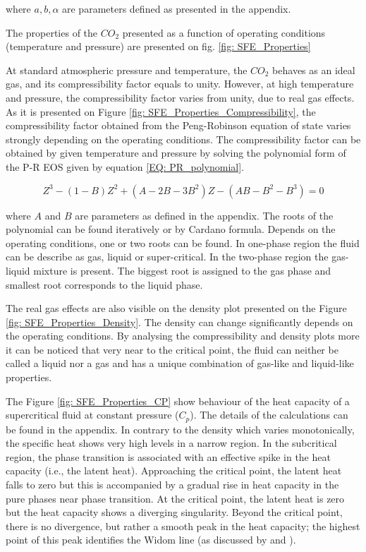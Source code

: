 \documentclass[../Article_Model_Parameters.tex]{subfiles}
\begin{document}
    where $a, b, \alpha$ are parameters defined as presented in the appendix.
    
    The properties of the $CO_2$ presented as a function of operating conditions (temperature and pressure) are presented on fig. \ref{fig: SFE_Properties}    
    
    At standard atmospheric pressure and temperature, the $CO_2$ behaves as an ideal gas, and its compressibility factor equals to unity.  However, at high temperature and pressure, the compressibility factor varies from unity, due to real gas effects. As it is presented on Figure \ref{fig: SFE_Properties_Compressibility}, the compressibility factor obtained from the Peng-Robinson equation of state varies strongly depending on the operating conditions. The compressibility factor can be obtained by given temperature and pressure by solving the polynomial form of the P-R EOS given by equation \ref{EQ: PR_polynomial}.

    {\footnotesize
    \begin{equation}
        Z^3 - (1-B)Z^2+(A-2B-3B^2)Z -(AB-B^2-B^3) = 0
        \label{EQ: PR_polynomial}
    \end{equation}
    }

    where $A$ and $B$ are parameters as defined in the appendix. The roots of the polynomial can be found iteratively or by Cardano formula. Depends on the operating conditions, one or two roots can be found. In one-phase region the fluid can be describe as gas, liquid or super-critical. In the two-phase region the gas-liquid mixture is present. The biggest root is assigned to the gas phase and smallest root corresponds to the liquid phase.

    The real gas effects are also visible on the density plot presented on the Figure \ref{fig: SFE_Properties_Density}. The density can change significantly depends on the operating conditions. 
    By analysing the compressibility and density plots more it can be noticed that very near to the critical point, the fluid can neither be called a liquid nor a gas and has a unique combination of gas-like and liquid-like properties. 

    The Figure \ref{fig: SFE_Properties_CP} show behaviour of the heat capacity of a supercritical fluid at constant pressure ($C_p$). The details of the calculations can be found in the appendix. In contrary to the density which varies monotonically, the specific heat shows very high levels in a narrow region. In the subcritical region, the phase transition is associated with an effective spike in the heat capacity (i.e., the latent heat). Approaching the critical point, the latent heat falls to zero but this is accompanied by a gradual rise in heat capacity in the pure phases near phase transition. At the critical point, the latent heat is zero but the heat capacity shows a diverging singularity. Beyond the critical point, there is no divergence, but rather a smooth peak in the heat capacity; the highest point of this peak identifies the Widom line (as discussed by \citet{Simeoni2010} and \citet{Banuti2019}).
\end{document}
